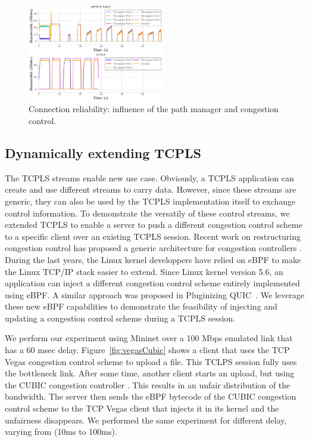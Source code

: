 \begin{figure}[!t]
  \begin{center}
    \includegraphics[width=6cm]{figures/tcpls_mptcp.png}
  \end{center}
  \caption{Connection reliability: influence of the path manager and congestion
  control.}
\end{figure}



\subsection{Dynamically extending TCPLS}

The TCPLS streams enable new use case. Obviously, a TCPLS application can
create and use different streams to carry data. However, since these streams
are generic, they can also be used by the TCPLS implementation itself to
exchange control information. To demonstrate the versatily of these control
streams, we extended TCPLS to enable a server to push a different congestion
control scheme to a specific client over an existing TCPLS session. Recent
work on restructuring congestion control has proposed a generic architecture
for congestion controllers \cite{narayan2018restructuring}. 
During the last years, the Linux kernel developpers have relied on eBPF
to make the Linux TCP/IP stack \cite{brakmo2017tcp,tran2020beyond} easier
to extend. Since Linux kernel version 5.6, an application can inject
a different congestion control scheme entirely implemented using eBPF. A similar approach was proposed in Pluginizing QUIC~\cite{de2019pluginizing}.
We leverage these new eBPF capabilities to
demonstrate the feasibility of injecting and
updating a congestion control scheme during a TCPLS session.

We perform our experiment using Mininet over a 100 Mbps emulated link that has a 60 msec delay. Figure~\ref{fig:vegasCubic} shows a client that uses the TCP Vegas \cite{10.1145/190314.190317} congestion control scheme to upload a file. This TCLPS session fully uses the bottleneck link. After some time, another client starts an upload, but using the CUBIC congestion controller \cite{rfc8312}. This results in an unfair distribution of the bandwidth. The server then sends the eBPF bytecode of the CUBIC congestion control scheme to the TCP Vegas client that injects it in its kernel and the unfairness disappears. We performed the same experiment for different delay, ​​varying from (10ms to 100ms).


